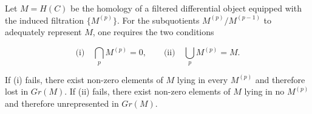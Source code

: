 Let $M = H(C)$ be the homology of a filtered differential object equipped with the induced filtration $\{M^{(p)}\}$. For the subquotients $M^{(p)}/M^{(p-1)}$ to adequately represent $M$, one requires the two conditions

$$\text{(i)} \quad \bigcap_{p} M^{(p)} = 0, \qquad \text{(ii)} \quad \bigcup_{p} M^{(p)} = M.$$

If (i) fails, there exist non-zero elements of $M$ lying in every $M^{(p)}$ and therefore lost in $Gr(M)$. If (ii) fails, there exist non-zero elements of $M$ lying in no $M^{(p)}$ and therefore unrepresented in $Gr(M)$.
